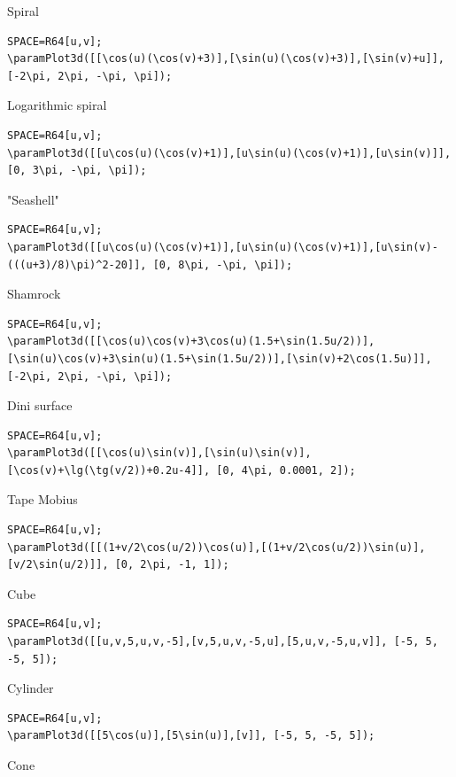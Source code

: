 Spiral

\begin{verbatim}
SPACE=R64[u,v];
\paramPlot3d([[\cos(u)(\cos(v)+3)],[\sin(u)(\cos(v)+3)],[\sin(v)+u]], [-2\pi, 2\pi, -\pi, \pi]);
\end{verbatim}

Logarithmic spiral 

\begin{verbatim}
SPACE=R64[u,v];
\paramPlot3d([[u\cos(u)(\cos(v)+1)],[u\sin(u)(\cos(v)+1)],[u\sin(v)]], [0, 3\pi, -\pi, \pi]);
\end{verbatim}

"Seashell" 

\begin{verbatim}
SPACE=R64[u,v];
\paramPlot3d([[u\cos(u)(\cos(v)+1)],[u\sin(u)(\cos(v)+1)],[u\sin(v)-(((u+3)/8)\pi)^2-20]], [0, 8\pi, -\pi, \pi]);
\end{verbatim}

Shamrock 

\begin{verbatim}
SPACE=R64[u,v];
\paramPlot3d([[\cos(u)\cos(v)+3\cos(u)(1.5+\sin(1.5u/2))],[\sin(u)\cos(v)+3\sin(u)(1.5+\sin(1.5u/2))],[\sin(v)+2\cos(1.5u)]], [-2\pi, 2\pi, -\pi, \pi]);
\end{verbatim}

Dini surface 

\begin{verbatim}
SPACE=R64[u,v];
\paramPlot3d([[\cos(u)\sin(v)],[\sin(u)\sin(v)],[\cos(v)+\lg(\tg(v/2))+0.2u-4]], [0, 4\pi, 0.0001, 2]);
\end{verbatim}

Tape Mobius

\begin{verbatim}
SPACE=R64[u,v];
\paramPlot3d([[(1+v/2\cos(u/2))\cos(u)],[(1+v/2\cos(u/2))\sin(u)],[v/2\sin(u/2)]], [0, 2\pi, -1, 1]);
\end{verbatim}

Cube

\begin{verbatim}
SPACE=R64[u,v];
\paramPlot3d([[u,v,5,u,v,-5],[v,5,u,v,-5,u],[5,u,v,-5,u,v]], [-5, 5, -5, 5]);
\end{verbatim}

Cylinder

\begin{verbatim}
SPACE=R64[u,v];
\paramPlot3d([[5\cos(u)],[5\sin(u)],[v]], [-5, 5, -5, 5]);
\end{verbatim}

Cone 

